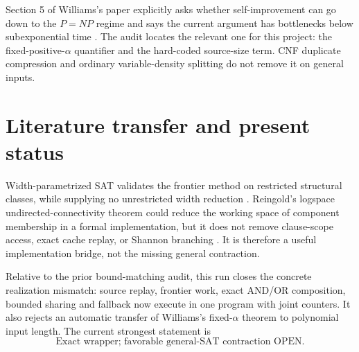 \documentclass[11pt]{article}
\begin{document}
Section 5 of Williams's paper explicitly asks whether self-improvement can go
down to the $P=NP$ regime and says the current argument has bottlenecks below
subexponential time \cite{williams2024}.  The audit locates the relevant one
for this project: the fixed-positive-$\alpha$ quantifier and the hard-coded
source-size term.  CNF duplicate compression and ordinary variable-density
splitting do not remove it on general inputs.

\section{Literature transfer and present status}
Width-parametrized SAT validates the frontier method on restricted structural
classes, while supplying no unrestricted width reduction
\cite{allender2014}.  Reingold's logspace undirected-connectivity theorem could
reduce the working space of component membership in a formal implementation,
but it does not remove clause-scope access, exact cache replay, or Shannon
branching \cite{reingold2008}.  It is therefore a useful implementation bridge,
not the missing general contraction.

Relative to the prior bound-matching audit, this run closes the concrete
realization mismatch: source replay, frontier work, exact AND/OR composition,
bounded sharing and fallback now execute in one program with joint counters.
It also rejects an automatic transfer of Williams's fixed-$\alpha$ theorem to
polynomial input length.  The current strongest statement is
\[
 \boxed{\text{Exact wrapper; favorable general-SAT contraction OPEN.}}
\]




\end{document}
